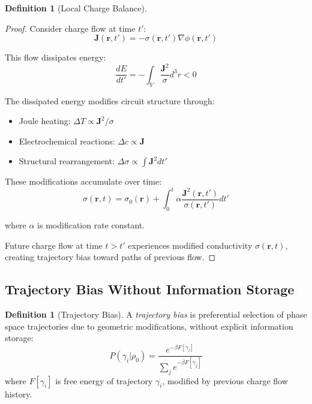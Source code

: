 \documentclass[12pt,a4paper]{article}
\theoremstyle{plain}
\theoremstyle{definition}
\newtheorem{definition}[theorem]{Definition}
\theoremstyle{remark}
\begin{document}
\begin{definition}[Local Charge Balance]
\begin{proof}
Consider charge flow at time $t'$:
\begin{equation}
\mathbf{J}(\mathbf{r},t') = -\sigma(\mathbf{r},t') \nabla \phi(\mathbf{r},t')
\end{equation}

This flow dissipates energy:
\begin{equation}
\frac{dE}{dt'} = -\int_V \frac{\mathbf{J}^2}{\sigma} d^3r < 0
\end{equation}

The dissipated energy modifies circuit structure through:
\begin{itemize}
\item Joule heating: $\Delta T \propto \mathbf{J}^2 / \sigma$
\item Electrochemical reactions: $\Delta c \propto \mathbf{J}$
\item Structural rearrangement: $\Delta \sigma \propto \int \mathbf{J}^2 dt'$
\end{itemize}

These modifications accumulate over time:
\begin{equation}
\sigma(\mathbf{r},t) = \sigma_0(\mathbf{r}) + \int_0^t \alpha \frac{\mathbf{J}^2(\mathbf{r},t')}{\sigma(\mathbf{r},t')} dt'
\end{equation}

where $\alpha$ is modification rate constant.

Future charge flow at time $t > t'$ experiences modified conductivity $\sigma(\mathbf{r},t)$, creating trajectory bias toward paths of previous flow.
\end{proof}

\subsection{Trajectory Bias Without Information Storage}

\begin{definition}[Trajectory Bias]
\label{def:trajectory_bias}
A \emph{trajectory bias} is preferential selection of phase space trajectories due to geometric modifications, without explicit information storage:
\begin{equation}
P(\gamma_i | \rho_0) = \frac{e^{-\beta F[\gamma_i]}}{\sum_j e^{-\beta F[\gamma_j]}}
\end{equation}
where $F[\gamma_i]$ is free energy of trajectory $\gamma_i$, modified by previous charge flow history.
\end{definition}


\end{definition}
\end{document}
